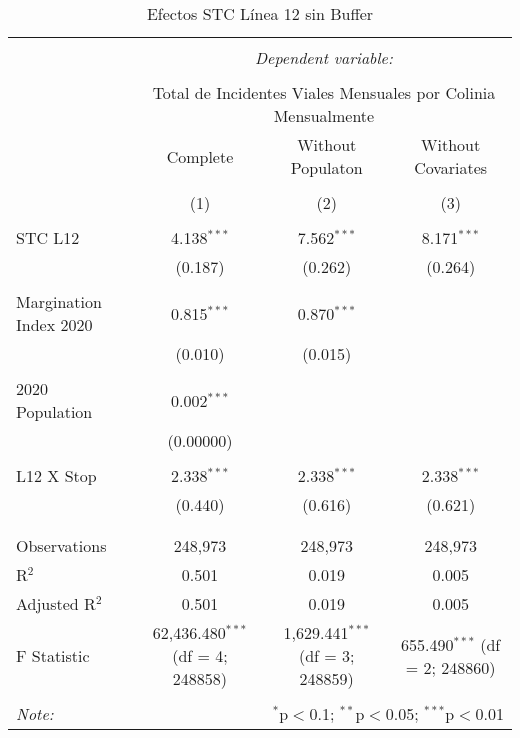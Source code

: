 
\begin{table}[!htbp] \centering 
  \caption{Efectos STC Línea 12 sin Buffer} 
  \label{} 
\begin{tabular}{@{\extracolsep{5pt}}lccc} 
\\[-1.8ex]\hline 
\hline \\[-1.8ex] 
 & \multicolumn{3}{c}{\textit{Dependent variable:}} \\ 
\cline{2-4} 
\\[-1.8ex] & \multicolumn{3}{c}{Total de Incidentes Viales Mensuales por Colinia Mensualmente} \\ 
 & Complete & Without Populaton & Without Covariates \\ 
\\[-1.8ex] & (1) & (2) & (3)\\ 
\hline \\[-1.8ex] 
 STC L12 & 4.138$^{***}$ & 7.562$^{***}$ & 8.171$^{***}$ \\ 
  & (0.187) & (0.262) & (0.264) \\ 
  & & & \\ 
 Margination Index 2020 & 0.815$^{***}$ & 0.870$^{***}$ &  \\ 
  & (0.010) & (0.015) &  \\ 
  & & & \\ 
 2020 Population & 0.002$^{***}$ &  &  \\ 
  & (0.00000) &  &  \\ 
  & & & \\ 
 L12 X Stop & 2.338$^{***}$ & 2.338$^{***}$ & 2.338$^{***}$ \\ 
  & (0.440) & (0.616) & (0.621) \\ 
  & & & \\ 
\hline \\[-1.8ex] 
Observations & 248,973 & 248,973 & 248,973 \\ 
R$^{2}$ & 0.501 & 0.019 & 0.005 \\ 
Adjusted R$^{2}$ & 0.501 & 0.019 & 0.005 \\ 
F Statistic & 62,436.480$^{***}$ (df = 4; 248858) & 1,629.441$^{***}$ (df = 3; 248859) & 655.490$^{***}$ (df = 2; 248860) \\ 
\hline 
\hline \\[-1.8ex] 
\textit{Note:}  & \multicolumn{3}{r}{$^{*}$p$<$0.1; $^{**}$p$<$0.05; $^{***}$p$<$0.01} \\ 
\end{tabular} 
\end{table} 
